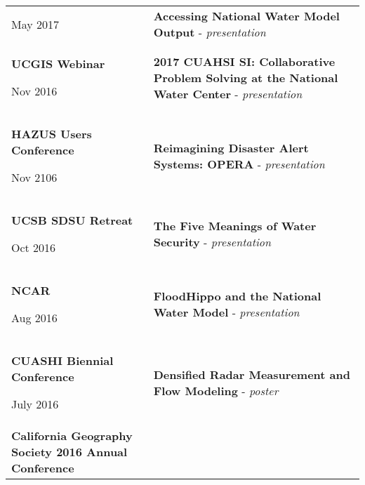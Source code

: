 \begin{longtable}[]{@{}ll@{}}
\begin{minipage}[t]{0.47\columnwidth}
May 2017\strut
\end{minipage} & \begin{minipage}[t]{0.47\columnwidth}\raggedright
\textbf{Accessing National Water Model Output} -
\emph{presentation}\strut
\end{minipage}\tabularnewline
\begin{minipage}[t]{0.47\columnwidth}\raggedright
\textbf{UCGIS Webinar }

Nov 2016\strut
\end{minipage} & \begin{minipage}[t]{0.47\columnwidth}\raggedright
\textbf{2017 CUAHSI SI: Collaborative Problem Solving at the National
Water Center} - \emph{presentation}\strut
\end{minipage}\tabularnewline
\begin{minipage}[t]{0.47\columnwidth}\raggedright
\textbf{HAZUS Users Conference}

Nov 2106\strut
\end{minipage} & \begin{minipage}[t]{0.47\columnwidth}\raggedright
\textbf{Reimagining Disaster Alert Systems: OPERA} -
\emph{presentation}\strut
\end{minipage}\tabularnewline
\begin{minipage}[t]{0.47\columnwidth}\raggedright
\textbf{UCSB SDSU Retreat}

Oct 2016\strut
\end{minipage} & \begin{minipage}[t]{0.47\columnwidth}\raggedright
\textbf{The Five Meanings of Water Security} - \emph{presentation}\strut
\end{minipage}\tabularnewline
\begin{minipage}[t]{0.47\columnwidth}\raggedright
\textbf{NCAR}

Aug 2016\strut
\end{minipage} & \begin{minipage}[t]{0.47\columnwidth}\raggedright
\textbf{FloodHippo and the National Water Model} -
\emph{presentation}\strut
\end{minipage}\tabularnewline
\begin{minipage}[t]{0.47\columnwidth}\raggedright
\textbf{CUASHI Biennial Conference}

July 2016\strut
\end{minipage} & \begin{minipage}[t]{0.47\columnwidth}\raggedright
\textbf{Densified Radar Measurement and Flow Modeling} -
\emph{poster}\strut
\end{minipage}\tabularnewline
\begin{minipage}[t]{0.47\columnwidth}\raggedright
\textbf{California Geography Society 2016 Annual Conference}


\end{minipage}
\end{longtable}
